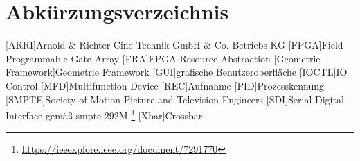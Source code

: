 
\chapter{Abk\"urzungsverzeichnis}


\begin{acronym}
	[ARRI]{Arnold \& Richter Cine Technik GmbH \& Co. Betriebs KG}
	[FPGA]{Field Programmable Gate Array}
	[FRA]{FPGA Resource Abstraction}
	[Geometrie Framework]{Geometrie Framework}
	[GUI]{grafische Benutzeroberfläche}
	[IOCTL]{IO Control}
	[MFD]{Multifunction Device}
	[REC]{Aufnahme}
	[PID]{Prozesskennung}
	[SMPTE]{Society of Motion Picture and Television Engineers}
	[SDI]{Serial Digital Interface} gemäß \ac{smpte} 292M \footnote{\url{https://ieeexplore.ieee.org/document/7291770}}
	[Xbar]{Crossbar}
	
\end{acronym}
